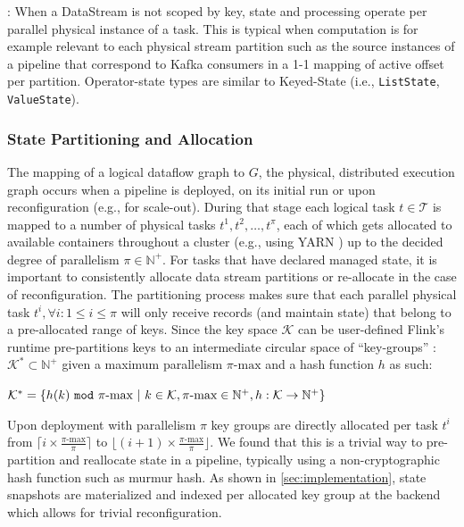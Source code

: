 : When a DataStream is not scoped by key, state and processing operate per parallel physical instance of a task. This is typical when computation is for example relevant to each physical stream partition such as the source instances of a pipeline that correspond to Kafka consumers in a 1-1 mapping of active offset per partition. Operator-state types are similar to Keyed-State (i.e., \texttt{ListState}, \texttt{ValueState}). 

\subsubsection{State Partitioning and Allocation}

The mapping of a logical dataflow graph to $G$, the physical, distributed execution graph occurs when a pipeline is deployed, on its initial run or upon reconfiguration (e.g., for scale-out). During that stage each logical task $t \in \mathcal{T}$ is mapped to a number of physical tasks $t^1, t^2, \ldots, t^\pi$, each of which gets allocated to available containers throughout a cluster (e.g., using YARN \cite{vavilapalli2013apache}) up to the decided degree of parallelism $\pi \in \mathbb{N^+}$. For tasks that have declared managed state, it is important to consistently allocate data stream partitions or re-allocate in the case of reconfiguration. The partitioning process makes sure that each parallel physical task $t^i , \forall i : 1 \leq i \leq \pi$ will only receive records (and maintain state) that belong to a pre-allocated range of keys. Since the key space $\mathcal{K}$ can be user-defined Flink's runtime pre-partitions keys to an intermediate circular space of ``key-groups'' : $\mathcal{K}^* \subset \mathbb{N^+}$ given a maximum parallelism $\pi\text{-max}$ and a hash function $h$ as such:

\noindent $\mathcal{K}^* = \{ h(k)\text{ \texttt{mod} }\pi\text{-max}\text{ }|\text{ }k \in \mathcal{K}, \pi\text{-max} \in \mathbb{N^+}, h: \mathcal{K} \rightarrow \mathbb{N^+} \}$

Upon deployment with parallelism $\pi$ key groups are directly allocated per task $t^i$ from $\lceil i \times \frac{\pi\text{-max}}{\pi} \rceil$ to $\lfloor (i+1) \times \frac{\pi\text{-max}}{\pi} \rfloor$. We found that this is a trivial way to pre-partition and reallocate state in a pipeline, typically using a non-cryptographic hash function such as murmur hash. As shown in \autoref{sec:implementation}, state snapshots are materialized and indexed per allocated key group at the backend which allows for trivial reconfiguration. 

